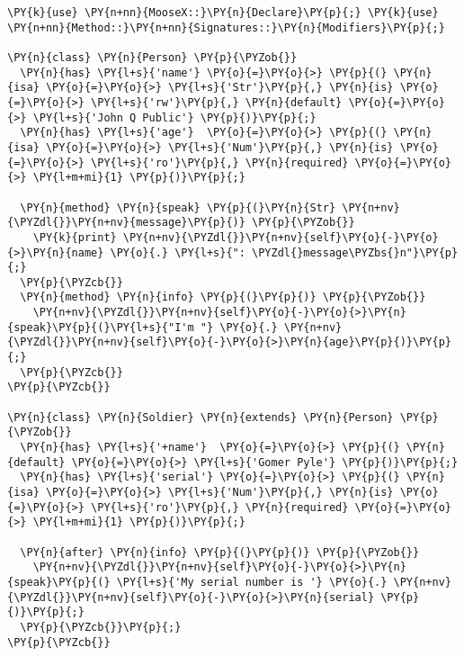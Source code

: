 \begin{Verbatim}[commandchars=\\\{\}]
\PY{k}{use} \PY{n+nn}{MooseX::}\PY{n}{Declare}\PY{p}{;} \PY{k}{use} \PY{n+nn}{Method::}\PY{n+nn}{Signatures::}\PY{n}{Modifiers}\PY{p}{;}

\PY{n}{class} \PY{n}{Person} \PY{p}{\PYZob{}}
  \PY{n}{has} \PY{l+s}{'name'} \PY{o}{=}\PY{o}{>} \PY{p}{(} \PY{n}{isa} \PY{o}{=}\PY{o}{>} \PY{l+s}{'Str'}\PY{p}{,} \PY{n}{is} \PY{o}{=}\PY{o}{>} \PY{l+s}{'rw'}\PY{p}{,} \PY{n}{default} \PY{o}{=}\PY{o}{>} \PY{l+s}{'John Q Public'} \PY{p}{)}\PY{p}{;}
  \PY{n}{has} \PY{l+s}{'age'}  \PY{o}{=}\PY{o}{>} \PY{p}{(} \PY{n}{isa} \PY{o}{=}\PY{o}{>} \PY{l+s}{'Num'}\PY{p}{,} \PY{n}{is} \PY{o}{=}\PY{o}{>} \PY{l+s}{'ro'}\PY{p}{,} \PY{n}{required} \PY{o}{=}\PY{o}{>} \PY{l+m+mi}{1} \PY{p}{)}\PY{p}{;}

  \PY{n}{method} \PY{n}{speak} \PY{p}{(}\PY{n}{Str} \PY{n+nv}{\PYZdl{}}\PY{n+nv}{message}\PY{p}{)} \PY{p}{\PYZob{}}
    \PY{k}{print} \PY{n+nv}{\PYZdl{}}\PY{n+nv}{self}\PY{o}{-}\PY{o}{>}\PY{n}{name} \PY{o}{.} \PY{l+s}{": \PYZdl{}message\PYZbs{}n"}\PY{p}{;}
  \PY{p}{\PYZcb{}}
  \PY{n}{method} \PY{n}{info} \PY{p}{(}\PY{p}{)} \PY{p}{\PYZob{}}
    \PY{n+nv}{\PYZdl{}}\PY{n+nv}{self}\PY{o}{-}\PY{o}{>}\PY{n}{speak}\PY{p}{(}\PY{l+s}{"I'm "} \PY{o}{.} \PY{n+nv}{\PYZdl{}}\PY{n+nv}{self}\PY{o}{-}\PY{o}{>}\PY{n}{age}\PY{p}{)}\PY{p}{;} 
  \PY{p}{\PYZcb{}}
\PY{p}{\PYZcb{}}

\PY{n}{class} \PY{n}{Soldier} \PY{n}{extends} \PY{n}{Person} \PY{p}{\PYZob{}}
  \PY{n}{has} \PY{l+s}{'+name'}  \PY{o}{=}\PY{o}{>} \PY{p}{(} \PY{n}{default} \PY{o}{=}\PY{o}{>} \PY{l+s}{'Gomer Pyle'} \PY{p}{)}\PY{p}{;}
  \PY{n}{has} \PY{l+s}{'serial'} \PY{o}{=}\PY{o}{>} \PY{p}{(} \PY{n}{isa} \PY{o}{=}\PY{o}{>} \PY{l+s}{'Num'}\PY{p}{,} \PY{n}{is} \PY{o}{=}\PY{o}{>} \PY{l+s}{'ro'}\PY{p}{,} \PY{n}{required} \PY{o}{=}\PY{o}{>} \PY{l+m+mi}{1} \PY{p}{)}\PY{p}{;}

  \PY{n}{after} \PY{n}{info} \PY{p}{(}\PY{p}{)} \PY{p}{\PYZob{}}
    \PY{n+nv}{\PYZdl{}}\PY{n+nv}{self}\PY{o}{-}\PY{o}{>}\PY{n}{speak}\PY{p}{(} \PY{l+s}{'My serial number is '} \PY{o}{.} \PY{n+nv}{\PYZdl{}}\PY{n+nv}{self}\PY{o}{-}\PY{o}{>}\PY{n}{serial} \PY{p}{)}\PY{p}{;}
  \PY{p}{\PYZcb{}}\PY{p}{;}
\PY{p}{\PYZcb{}}
\end{Verbatim}

